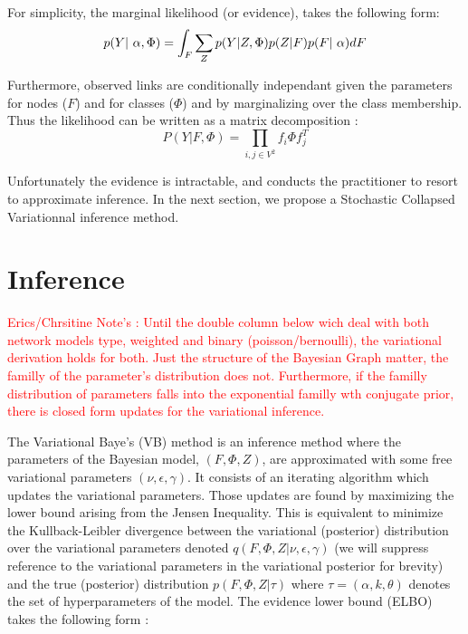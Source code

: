 
For simplicity, the marginal likelihood (or evidence), takes the following form:
\begin{equation}
    \p(Y | \alpha, \Phi) = \int_F \sum_Z \p(Y| Z, \Phi) \p(Z|F) \p(F| \alpha) dF
\end{equation}

Furthermore, observed links are conditionally independant given the parameters for nodes ($F$) and for classes ($\Phi$) and by marginalizing over the class membership. Thus the likelihood can be written as a matrix decomposition :
\begin{equation}
P(Y | F, \Phi) = \prod_{i,j \in V^2} f_i \Phi f_j^T
\end{equation} 

Unfortunately the evidence is intractable, and conducts the practitioner to resort to approximate inference. In the next section, we propose a Stochastic Collapsed Variationnal inference method.

\section{Inference}

\textcolor{red}{Erics/Chrsitine Note's : Until the double column below wich deal with both network models type, weighted and binary (poisson/bernoulli), the variational derivation holds for both. Just the structure of the Bayesian Graph matter, the familly of the parameter's distribution does not. Furthermore, if the familly distribution of parameters falls into the exponential familly wth conjugate prior, there is closed form updates for the variational inference.}

The Variational Baye's (VB) method is an inference method where the parameters of the Bayesian model, $(F, \Phi, Z)$, are approximated with some free variational parameters $(\nu, \epsilon, \gamma)$. It consists of an iterating algorithm which updates the variational parameters. Those updates are found by maximizing the lower bound arising from the Jensen Inequality. This is equivalent to  minimize the Kullback-Leibler divergence between the variational (posterior) distribution over the variational parameters denoted $q(F, \Phi, Z | \nu, \epsilon, \gamma)$ (we will suppress reference to the variational parameters in the variational posterior for brevity) and the true (posterior) distribution $p(F, \Phi, Z | \tau)$ where $\tau = (\alpha, k, \theta)$ denotes the set of hyperparameters of the model. The evidence lower bound (ELBO) takes the following form :

